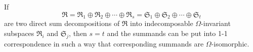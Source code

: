 If
$$\mathfrak{R} = \mathfrak{R}_1 \oplus \mathfrak{R}_2 \oplus \cdots \oplus \mathfrak{R}_s = \mathfrak{S}_1 \oplus \mathfrak{S}_2 \oplus \cdots \oplus \mathfrak{S}_t$$
are two direct sum decompositions of $\mathfrak{R}$ into indecomposable $\Omega$-invariant subspaces $\mathfrak{R}_i$ and $\mathfrak{S}_j$, then $s = t$ and the summands can be put into 1-1 correspondence in such a way that corresponding summands are $\Omega$-isomorphic.
